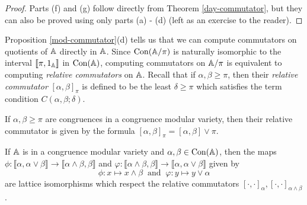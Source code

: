 \begin{appendices}
\begin{proof}
Parts (f) and (g) follow directly from Theorem \ref{day-commutator}, but they can also be proved using only parts (a) - (d) (left as an exercise to the reader).
\end{proof}

Proposition \ref{mod-commutator}(d) tells us that we can compute commutators on quotients of $\mathbb{A}$ directly in $\mathbb{A}$. Since $\operatorname{Con}(\mathbb{A}/\pi)$ is naturally isomorphic to the interval $\llbracket \pi, 1_{\mathbb{A}}\rrbracket$ in $\operatorname{Con}(\mathbb{A})$, computing commutators on $\mathbb{A}/\pi$ is equivalent to computing \emph{relative commutators} on $\mathbb{A}$. Recall that if $\alpha,\beta \ge \pi$, then their \emph{relative commutator} $[\alpha,\beta]_\pi$ is defined to be the least $\delta \ge \pi$ which satisfies the term condition $C(\alpha,\beta;\delta)$.

\begin{cor} If $\alpha,\beta \ge \pi$ are congruences in a congruence modular variety, then their relative commutator is given by the formula $[\alpha,\beta]_\pi = [\alpha,\beta]\vee \pi$.
\end{cor}

\begin{thm}\label{diamond-isom} If $\mathbb{A}$ is in a congruence modular variety and $\alpha, \beta \in \operatorname{Con}(\mathbb{A})$, then the maps $\phi : \llbracket \alpha,\alpha\vee \beta\rrbracket \rightarrow \llbracket \alpha\wedge \beta, \beta\rrbracket$ and $\varphi: \llbracket\alpha\wedge \beta, \beta\rrbracket \rightarrow \llbracket\alpha,\alpha\vee \beta\rrbracket$ given by
\[
\phi : x \mapsto x\wedge \beta\ \text{ and }\ \varphi : y \mapsto y\vee \alpha
\]
are lattice isomorphisms which respect the relative commutators $[\cdot,\cdot]_\alpha, [\cdot,\cdot]_{\alpha\wedge\beta}$.


\end{thm}
\end{appendices}

